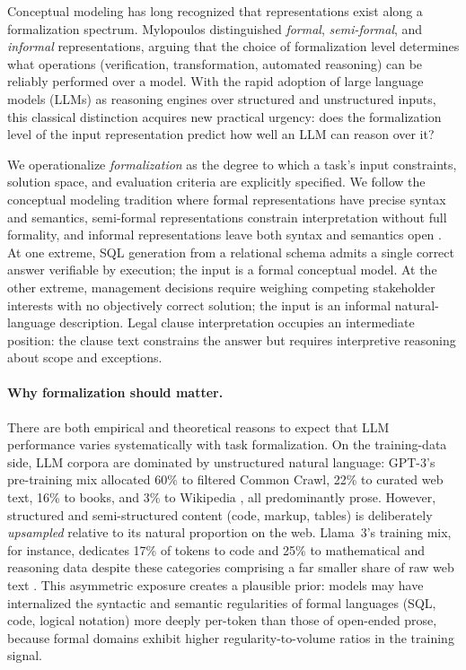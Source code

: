 \documentclass[runningheads]{llncs}
\begin{document}
Conceptual modeling has long recognized that representations exist along a formalization spectrum. Mylopoulos \cite{mylopoulos1992conceptual} distinguished \emph{formal}, \emph{semi-formal}, and \emph{informal} representations, arguing that the choice of formalization level determines what operations (verification, transformation, automated reasoning) can be reliably performed over a model. With the rapid adoption of large language models (LLMs) as reasoning engines over structured and unstructured inputs, this classical distinction acquires new practical urgency: does the formalization level of the input representation predict how well an LLM can reason over it?

We operationalize \emph{formalization} as the degree to which a task's input constraints, solution space, and evaluation criteria are explicitly specified. We follow the conceptual modeling tradition where formal representations have precise syntax and semantics, semi-formal representations constrain interpretation without full formality, and informal representations leave both syntax and semantics open \cite{mylopoulos1992conceptual,olive2007conceptual}. At one extreme, SQL generation from a relational schema admits a single correct answer verifiable by execution; the input is a formal conceptual model. At the other extreme, management decisions require weighing competing stakeholder interests with no objectively correct solution; the input is an informal natural-language description. Legal clause interpretation occupies an intermediate position: the clause text constrains the answer but requires interpretive reasoning about scope and exceptions.

\paragraph{Why formalization should matter.}
There are both empirical and theoretical reasons to expect that LLM performance varies systematically with task formalization. On the training-data side, LLM corpora are dominated by unstructured natural language: GPT-3's pre-training mix allocated 60\% to filtered Common Crawl, 22\% to curated web text, 16\% to books, and 3\% to Wikipedia \cite{brown2020language}, all predominantly prose. However, structured and semi-structured content (code, markup, tables) is deliberately \emph{upsampled} relative to its natural proportion on the web. Llama~3's training mix, for instance, dedicates 17\% of tokens to code and 25\% to mathematical and reasoning data despite these categories comprising a far smaller share of raw web text \cite{dubey2024llama}. This asymmetric exposure creates a plausible prior: models may have internalized the syntactic and semantic regularities of formal languages (SQL, code, logical notation) more deeply per-token than those of open-ended prose, because formal domains exhibit higher regularity-to-volume ratios in the training signal.
\end{document}
